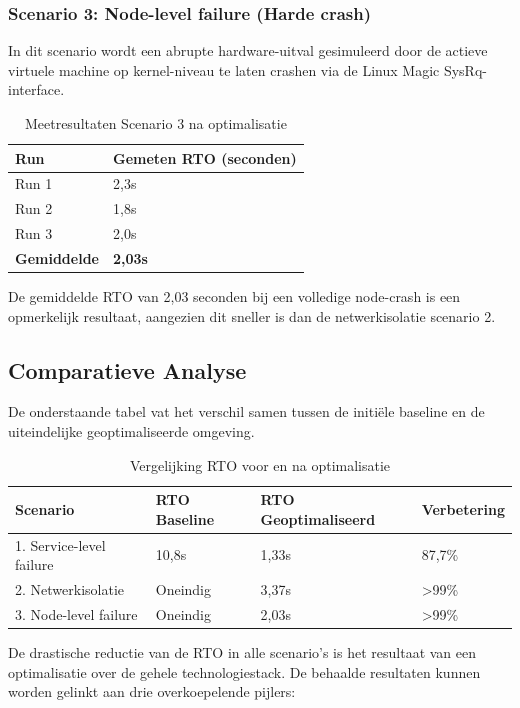 \subsubsection{Scenario 3: Node-level failure (Harde crash)}
In dit scenario wordt een abrupte hardware-uitval gesimuleerd door de actieve virtuele machine op kernel-niveau te laten crashen via de Linux Magic SysRq-interface.

\begin{table}[H]
    \centering
    \begin{tabular}{|l|l|}
        \hline
        \textbf{Run} & \textbf{Gemeten RTO (seconden)} \\ \hline
        Run 1 & 2,3s \\ \hline
        Run 2 & 1,8s \\ \hline
        Run 3 & 2,0s \\ \hline
        \textbf{Gemiddelde} & \textbf{2,03s} \\ \hline
    \end{tabular}
    \caption{Meetresultaten Scenario 3 na optimalisatie}
\end{table}

De gemiddelde RTO van 2,03 seconden bij een volledige node-crash is een opmerkelijk resultaat, aangezien dit sneller is dan de netwerkisolatie scenario 2.

\subsection{Comparatieve Analyse}
De onderstaande tabel vat het verschil samen tussen de initiële baseline en de uiteindelijke geoptimaliseerde omgeving.

\begin{table}[H]
    \centering
    \begin{tabular}{|l|l|l|l|}
        \hline
        \textbf{Scenario} & \textbf{RTO Baseline} & \textbf{RTO Geoptimaliseerd} & \textbf{Verbetering} \\ \hline
        1. Service-level failure & 10,8s & 1,33s & 87,7\% \\ \hline
        2. Netwerkisolatie & Oneindig & 3,37s & >99\% \\ \hline
        3. Node-level failure & Oneindig & 2,03s & >99\% \\ \hline
    \end{tabular}
    \caption{Vergelijking RTO voor en na optimalisatie}
\end{table}

De drastische reductie van de RTO in alle scenario's is het resultaat van een optimalisatie over de gehele technologiestack. De behaalde resultaten kunnen worden gelinkt aan drie overkoepelende pijlers:

